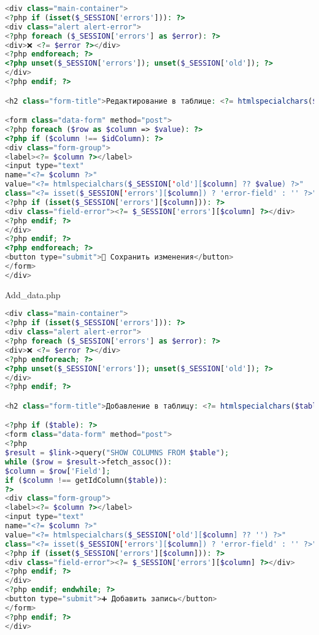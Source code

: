 \begin{lstlisting}[language=Php, frame=none]
<div class="main-container">
<?php if (isset($_SESSION['errors'])): ?>
<div class="alert alert-error">
<?php foreach ($_SESSION['errors'] as $error): ?>
<div>❌ <?= $error ?></div>
<?php endforeach; ?>
<?php unset($_SESSION['errors']); unset($_SESSION['old']); ?>
</div>
<?php endif; ?>

<h2 class="form-title">Редактирование в таблице: <?= htmlspecialchars($table) ?></h2>

<form class="data-form" method="post">
<?php foreach ($row as $column => $value): ?>
<?php if ($column !== $idColumn): ?>
<div class="form-group">
<label><?= $column ?></label>
<input type="text" 
name="<?= $column ?>" 
value="<?= htmlspecialchars($_SESSION['old'][$column] ?? $value) ?>"
class="<?= isset($_SESSION['errors'][$column]) ? 'error-field' : '' ?>">
<?php if (isset($_SESSION['errors'][$column])): ?>
<div class="field-error"><?= $_SESSION['errors'][$column] ?></div>
<?php endif; ?>
</div>
<?php endif; ?>
<?php endforeach; ?>
<button type="submit">💾 Сохранить изменения</button>
</form>
</div>
\end{lstlisting}

Add\_data.php

\begin{lstlisting}[language=PHP, frame=none]
    <div class="main-container">
<?php if (isset($_SESSION['errors'])): ?>
<div class="alert alert-error">
<?php foreach ($_SESSION['errors'] as $error): ?>
<div>❌ <?= $error ?></div>
<?php endforeach; ?>
<?php unset($_SESSION['errors']); unset($_SESSION['old']); ?>
</div>
<?php endif; ?>

<h2 class="form-title">Добавление в таблицу: <?= htmlspecialchars($table) ?></h2>

<?php if ($table): ?>
<form class="data-form" method="post">
<?php
$result = $link->query("SHOW COLUMNS FROM $table");
while ($row = $result->fetch_assoc()):
$column = $row['Field'];
if ($column !== getIdColumn($table)):
?>
<div class="form-group">
<label><?= $column ?></label>
<input type="text" 
name="<?= $column ?>" 
value="<?= htmlspecialchars($_SESSION['old'][$column] ?? '') ?>"
class="<?= isset($_SESSION['errors'][$column]) ? 'error-field' : '' ?>">
<?php if (isset($_SESSION['errors'][$column])): ?>
<div class="field-error"><?= $_SESSION['errors'][$column] ?></div>
<?php endif; ?>
</div>
<?php endif; endwhile; ?>
<button type="submit">➕ Добавить запись</button>
</form>
<?php endif; ?>
</div>
\end{lstlisting}

